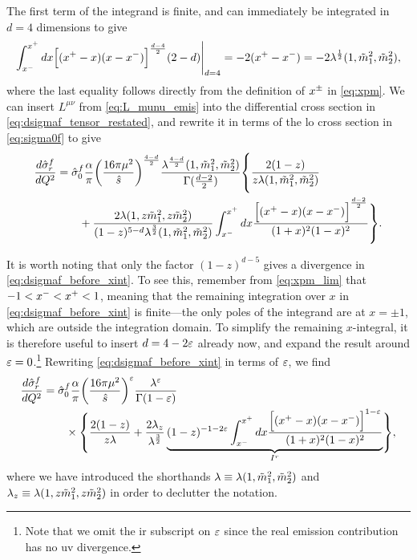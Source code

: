 The first term of the integrand is finite, and can immediately be integrated in $d=4$ dimensions to give
\begin{equation}
    \int_{x^-}^{x^+} dx \Bigl[ (x^+-x)(x-x^-) \Bigr]^{\frac{d-4}{2}} (2-d) \Biggr\vert_{d=4} = -2(x^+-x^-) = -2\lambda^{\frac{1}{2}}(1,\tilde{m}_1^2,\tilde{m}_2^2),
\end{equation}
where the last equality follows directly from the definition of $x^\pm$ in \cref{eq:xpm}.
We can insert $L^{\mu\nu}$ from \cref{eq:L_munu_emis} into the differential cross section in \cref{eq:dsigmaf_tensor_restated}, and rewrite it in terms of the \gls{lo} cross section in \cref{eq:sigma0f} to give
\begin{align}
\label{eq:dsigmaf_before_xint}
\begin{split}
    \frac{d\hat{\sigma}^f_r}{dQ^2} &=
    \hat\sigma^f_0
    \frac{\alpha}{\pi}
    \biggl(\frac{16\pi\mu^2}{\shat}\biggr)^{\frac{4-d}{2}}
    \frac{\lambda^{\frac{4-d}{2}}(1,\mt_1^2,\mt_2^2)}{\Gamma(\frac{d-2}{2})}
    \vastl\{
        \frac{2(1-z)}{z \lambda(1,\mt_1^2,\mt_2^2)}
        \\ &\qquad
        + \frac{2 \lambda(1,z\mt_1^2,z\mt_2^2)}{(1-z)^{5-d} \lambda^{\frac{3}{2}}(1,\mt_1^2,\mt_2^2)}
        \int_{\xm}^{\xp} dx \frac{\Bigl[(\xp-x)(x-\xm)\Bigr]^{\frac{d-2}{2}}}{(1+x)^2 (1-x)^2}
    \vastr\}.
\end{split}
\end{align}

It is worth noting that only the factor $(1-z)^{d-5}$ gives a divergence in \cref{eq:dsigmaf_before_xint}.
To see this, remember from \cref{eq:xpm_lim} that $-1 < x^- < x^+ < 1$, meaning that the remaining integration over $x$ in \cref{eq:dsigmaf_before_xint} is finite---the only poles of the integrand are at $x=\pm1$, which are outside the integration domain.
To simplify the remaining $x$-integral, it is therefore useful to insert $d=4-2\varepsilon$ already now, and expand the result around $\varepsilon=0$.\footnote{Note that we omit the \gls{ir} subscript on $\varepsilon$ since the real emission contribution has no \gls{uv} divergence.}
Rewriting \cref{eq:dsigmaf_before_xint} in terms of $\varepsilon$, we find
\begin{align}
\begin{split}
    \frac{d\hat{\sigma}^f_r}{dQ^2} &=
    \hat\sigma^f_0
    \frac{\alpha}{\pi}
    \biggl(\frac{16\pi\mu^2}{\shat}\biggr)^\eps
    \frac{\lambda^\eps}{\Gamma(1-\eps)}
    \\ &\qquad\times
    \vastl\{
        \frac{2(1-z)}{z \lambda}
        + \frac{2 \lambda_z}{\lambda^{\frac{3}{2}}}
        \underbrace{(1-z)^{-1-2\eps} \int_{\xm}^{\xp} dx \frac{\Bigl[(\xp-x)(x-\xm)\Bigr]^{1-\eps}}{(1+x)^2 (1-x)^2}}_{I^r}
    \vastr\},
\end{split}
\label{eq:_Ir}
\end{align}
where we have introduced the shorthands $\lambda\equiv\lambda(1,\tilde{m}_1^2,\tilde{m}_2^2)$ and $\lambda_z\equiv\lambda(1,z\tilde{m}_1^2,z\tilde{m}_2^2)$ in order to declutter the notation.

